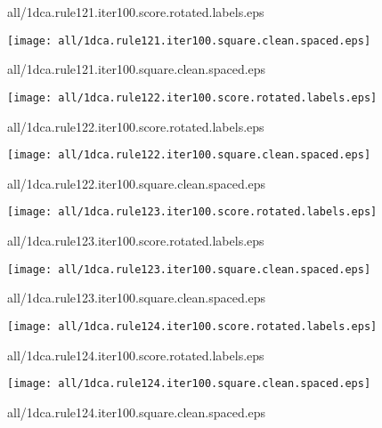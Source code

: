 \documentclass{article}
\begin{document}
{\footnotesize all/1dca.rule121.iter100.score.rotated.labels.eps}
\begin{center}
\begin{minipage}{\textwidth}
\texttt{[image: all/1dca.rule121.iter100.square.clean.spaced.eps]}
\end{minipage}
\end{center}
{\footnotesize all/1dca.rule121.iter100.square.clean.spaced.eps}
\begin{center}
\begin{minipage}{\textwidth}
\texttt{[image: all/1dca.rule122.iter100.score.rotated.labels.eps]}
\end{minipage}
\end{center}
{\footnotesize all/1dca.rule122.iter100.score.rotated.labels.eps}
\begin{center}
\begin{minipage}{\textwidth}
\texttt{[image: all/1dca.rule122.iter100.square.clean.spaced.eps]}
\end{minipage}
\end{center}
{\footnotesize all/1dca.rule122.iter100.square.clean.spaced.eps}
\begin{center}
\begin{minipage}{\textwidth}
\texttt{[image: all/1dca.rule123.iter100.score.rotated.labels.eps]}
\end{minipage}
\end{center}
{\footnotesize all/1dca.rule123.iter100.score.rotated.labels.eps}
\begin{center}
\begin{minipage}{\textwidth}
\texttt{[image: all/1dca.rule123.iter100.square.clean.spaced.eps]}
\end{minipage}
\end{center}
{\footnotesize all/1dca.rule123.iter100.square.clean.spaced.eps}
\begin{center}
\begin{minipage}{\textwidth}
\texttt{[image: all/1dca.rule124.iter100.score.rotated.labels.eps]}
\end{minipage}
\end{center}
{\footnotesize all/1dca.rule124.iter100.score.rotated.labels.eps}
\begin{center}
\begin{minipage}{\textwidth}
\texttt{[image: all/1dca.rule124.iter100.square.clean.spaced.eps]}
\end{minipage}
\end{center}
{\footnotesize all/1dca.rule124.iter100.square.clean.spaced.eps}
\end{document}
